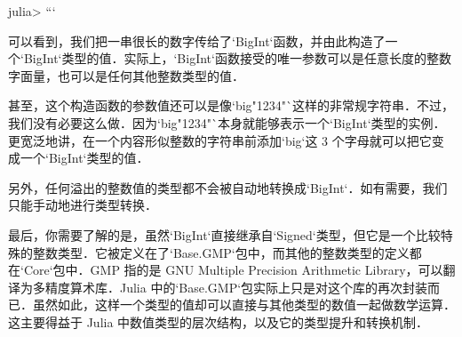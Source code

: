 julia>
```

可以看到，我们把一串很长的数字传给了`BigInt`函数，并由此构造了一个`BigInt`类型的值．实际上，`BigInt`函数接受的唯一参数可以是任意长度的整数字面量，也可以是任何其他整数类型的值．

甚至，这个构造函数的参数值还可以是像`big"1234"`这样的非常规字符串．不过，我们没有必要这么做．因为`big"1234"`本身就能够表示一个`BigInt`类型的实例．更宽泛地讲，在一个内容形似整数的字符串前添加`big`这 3 个字母就可以把它变成一个`BigInt`类型的值．

另外，任何溢出的整数值的类型都不会被自动地转换成`BigInt`．如有需要，我们只能手动地进行类型转换．

最后，你需要了解的是，虽然`BigInt`直接继承自`Signed`类型，但它是一个比较特殊的整数类型．它被定义在了`Base.GMP`包中，而其他的整数类型的定义都在`Core`包中．GMP 指的是 GNU Multiple Precision Arithmetic Library，可以翻译为多精度算术库．Julia 中的`Base.GMP`包实际上只是对这个库的再次封装而已．虽然如此，这样一个类型的值却可以直接与其他类型的数值一起做数学运算．这主要得益于 Julia 中数值类型的层次结构，以及它的类型提升和转换机制．